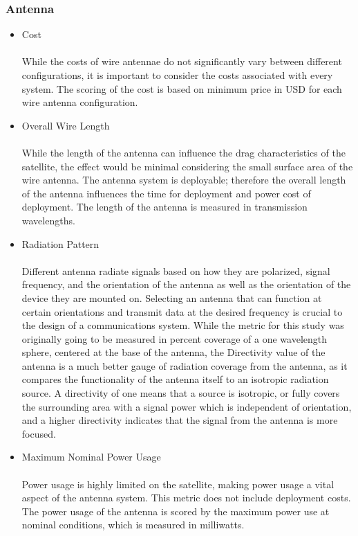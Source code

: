 \subsubsection{Antenna}
\begin{itemize}
    \item Cost\\
    \\
    While the costs of wire antennae do not significantly vary between different configurations, it is important to consider the costs associated with every system. The scoring of the cost is based on minimum price in USD for each wire antenna configuration.\\
    \item Overall Wire Length\\
    \\
    While the length of the antenna can influence the drag characteristics of the satellite, the effect would be minimal considering the small surface area of the wire antenna. The antenna system is deployable; therefore the overall length of the antenna influences the time for deployment and power cost of deployment. The length of the antenna is measured in transmission wavelengths.\\
    \item Radiation Pattern \\
    \\
    Different antenna radiate signals based on how they are polarized, signal frequency, and the orientation of the antenna as well as the orientation of the device they are mounted on. Selecting an antenna that can function at certain orientations and transmit data at the desired frequency is crucial to the design of a communications system. While the metric for this study was originally going to be measured in percent coverage of a one wavelength sphere, centered at the base of the antenna, the Directivity value of the antenna is a much better gauge of radiation coverage from the antenna, as it compares the functionality of the antenna itself to an isotropic radiation source. A directivity of one means that a source is isotropic, or fully covers the surrounding area with a signal power which is independent of orientation, and a higher directivity indicates that the signal from the antenna is more focused.\\
    \item Maximum Nominal Power Usage \\
    \\
    Power usage is highly limited on the satellite, making power usage a vital aspect of the antenna system. This metric does not include deployment costs. The power usage of the antenna is scored by the maximum power use at nominal conditions, which is measured in milliwatts.
\end{itemize}

